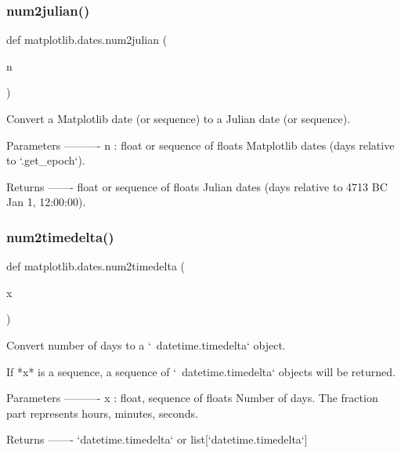 \subsubsection{\texorpdfstring{num2julian()}{num2julian()}}
{\footnotesize\ttfamily def matplotlib.\+dates.\+num2julian (\begin{DoxyParamCaption}\item[{}]{n }\end{DoxyParamCaption})}

\begin{DoxyVerb}Convert a Matplotlib date (or sequence) to a Julian date (or sequence).

Parameters
----------
n : float or sequence of floats
    Matplotlib dates (days relative to `.get_epoch`).

Returns
-------
float or sequence of floats
    Julian dates (days relative to 4713 BC Jan 1, 12:00:00).
\end{DoxyVerb}
 \mbox{\label{namespacematplotlib_1_1dates_ae3d5785cdee585c83253c587fac80324}} 
\subsubsection{\texorpdfstring{num2timedelta()}{num2timedelta()}}
{\footnotesize\ttfamily def matplotlib.\+dates.\+num2timedelta (\begin{DoxyParamCaption}\item[{}]{x }\end{DoxyParamCaption})}

\begin{DoxyVerb}Convert number of days to a `~datetime.timedelta` object.

If *x* is a sequence, a sequence of `~datetime.timedelta` objects will
be returned.

Parameters
----------
x : float, sequence of floats
    Number of days. The fraction part represents hours, minutes, seconds.

Returns
-------
`datetime.timedelta` or list[`datetime.timedelta`]
\end{DoxyVerb}
 \mbox{\label{namespacematplotlib_1_1dates_adde3fd7f7341998765df8ebe23ac00d1}} 
